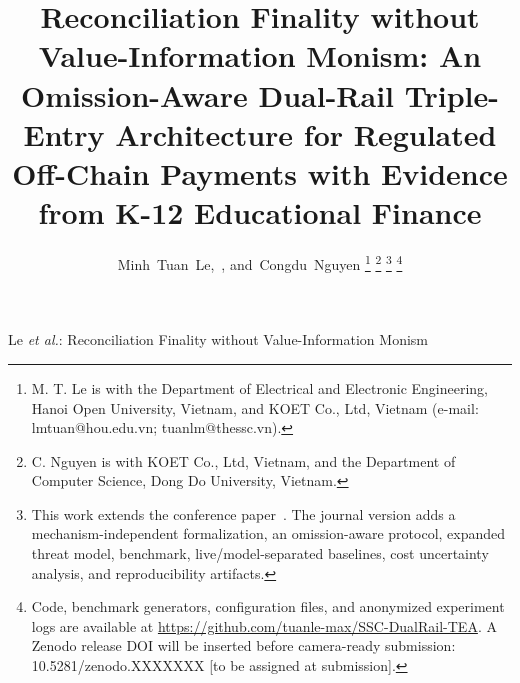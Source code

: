 \documentclass[journal]{IEEEtran}
\begin{document}
\title{Reconciliation Finality without Value-Information Monism: An Omission-Aware Dual-Rail Triple-Entry Architecture for Regulated Off-Chain Payments with Evidence from K-12 Educational Finance}

\author{Minh~Tuan~Le,~,
        and~Congdu~Nguyen
\thanks{M. T. Le is with the Department of Electrical and Electronic Engineering, Hanoi Open University, Vietnam, and KOET Co., Ltd, Vietnam (e-mail: lmtuan@hou.edu.vn; tuanlm@thessc.vn).}
\thanks{C. Nguyen is with KOET Co., Ltd, Vietnam, and the Department of Computer Science, Dong Do University, Vietnam.}
\thanks{This work extends the conference paper~\cite{le2026ssc}. The journal version adds a mechanism-independent formalization, an omission-aware protocol, expanded threat model, benchmark, live/model-separated baselines, cost uncertainty analysis, and reproducibility artifacts.}
\thanks{Code, benchmark generators, configuration files, and anonymized experiment logs are available at \url{https://github.com/tuanle-max/SSC-DualRail-TEA}. A Zenodo release DOI will be inserted before camera-ready submission: 10.5281/zenodo.XXXXXXX [to be assigned at submission].}
}

%
{Le \MakeLowercase{\textit{et al.}}: Reconciliation Finality without Value-Information Monism}

\maketitle
\end{document}
